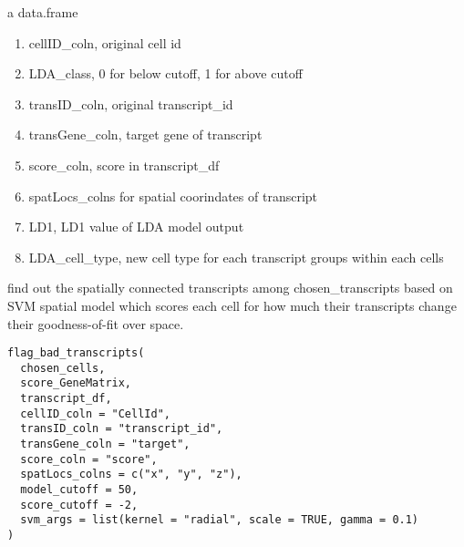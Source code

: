 \documentclass[letterpaper]{book}
\begin{document}
\begin{Value}
a data.frame
\begin{enumerate}

\item{} cellID\_coln, original cell id
\item{} LDA\_class, 0 for below cutoff, 1 for above cutoff
\item{} transID\_coln, original transcript\_id
\item{} transGene\_coln, target gene of transcript
\item{} score\_coln, score in transcript\_df
\item{} spatLocs\_colns for spatial coorindates of transcript
\item{} LD1, LD1 value of LDA model output
\item{} LDA\_cell\_type, new cell type for each transcript groups within each cells

\end{enumerate}

\end{Value}
%
\begin{Description}
find out the spatially connected transcripts among chosen\_transcripts based on SVM spatial model which scores each cell for how much their transcripts change their goodness-of-fit over space.
\end{Description}
%
\begin{Usage}
\begin{verbatim}
flag_bad_transcripts(
  chosen_cells,
  score_GeneMatrix,
  transcript_df,
  cellID_coln = "CellId",
  transID_coln = "transcript_id",
  transGene_coln = "target",
  score_coln = "score",
  spatLocs_colns = c("x", "y", "z"),
  model_cutoff = 50,
  score_cutoff = -2,
  svm_args = list(kernel = "radial", scale = TRUE, gamma = 0.1)
)
\end{verbatim}
\end{Usage}
%
\end{document}
